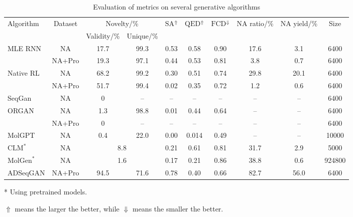 \documentclass[10pt, twocolumn]{article}
\begin{document}
\begin{table*}[h]
    \centering
    \small
    \begin{threeparttable}
	    \caption{Evaluation of metrics on several generative algorithms}
	    \label{tab:first}
	    \begin{tabular}{l c cc c c c c c c}
	        \toprule 
	        \multirow{2}{*}{Algorithm} & \multirow{2}{*}{Dataset} & \multicolumn{2}{c}{Novelty/\%} & \multirow{2}{*}{$\text{SA}^{\Uparrow}$} & \multirow{2}{*}{$\text{QED}^{\Uparrow}$} & \multirow{2}{*}{$\text{FCD}^{\Downarrow}$} & \multirow{2}{*}{NA ratio/\%} & \multirow{2}{*}{NA yield/\%} & \multirow{2}{*}{Size} \\  
	        \cmidrule(lr){3-4}
	                 &         &\footnotesize Validity/\% &\footnotesize Unique/\% &  &  &  &  &  &  \\  
	        \midrule 
	        MLE RNN          & NA       & 17.7 & 99.3 & 0.53 & 0.58 & 0.90 & 17.6 & 3.1 &6400\\ 
	                         & NA+Pro   & 19.3 & 97.1 & 0.44 & 0.53 & 0.81 & 3.8  & 0.7 &6400\\ 
	        Native RL        & NA       & 68.2 & 99.2 & 0.30 & 0.51 & 0.74 & 29.8 & 20.1&6400\\ 
	                         & NA+Pro   & 51.7 & 99.4 & 0.02 & 0.35 & 0.72 & 1.2  & 0.6 &6400\\ 
	        SeqGan           & NA       & 0    & --   & --   & --   & --   & --   & --  &6400\\ 
	        ORGAN            & NA       & 1.3  & 98.8 & 0.01 & 0.44 & 0.64 & --   & --  &6400\\ 
	                         & NA+Pro   & 0    & --   & --   & --   & --   & --   & --  &6400\\   
	        MolGPT           & NA       & 0.4  & 22.0 & 0.00 & 0.014& 0.49 & --   & --  &10000\\ \hline	        
	        $\text{CLM}^*$   & NA       &\multicolumn{2}{c}{8.8} & 0.21 & 0.61 & 0.81 & 31.7 & 2.9 &5000\\  
	        $\text{MolGen}^*$& NA       &\multicolumn{2}{c}{1.6} & 0.17 & 0.21 & 0.86 & 38.8 & 0.6 &924800\\ \hline
	        ADSeqGAN         & NA+Pro   & 94.5 & 71.6 & 0.78 & 0.40 & 0.66 & 82.7 & 56.0&6400\\
	        \bottomrule
	    \end{tabular}
	    \begin{tablenotes}	
			\item[*] Using pretrained models.
			\item[] \hspace{-1em} $\Uparrow$ means the larger the better, while $\Downarrow$ means the smaller the better.
	    \end{tablenotes}
	\end{threeparttable}
\end{table*}
\end{document}
